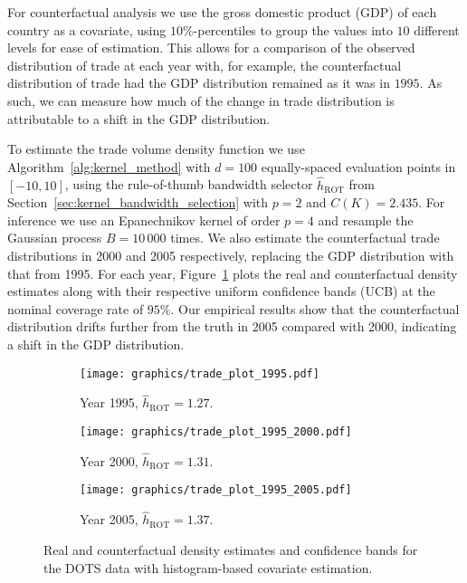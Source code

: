 \documentclass[11pt,lof]{puthesis}
\DeclareMathOperator{\ROT}{ROT}
\theoremstyle{break}
\theoremstyle{proof}
\begin{document}
For counterfactual analysis we use the gross domestic product (GDP) of each
country as a covariate, using $10\%$-percentiles to group the values into $10$
different levels for ease of estimation. This allows for a comparison of the
observed distribution of trade at each year with, for example, the
counterfactual distribution of trade had the GDP distribution remained as it
was in $1995$. As such, we can measure how much of the change in trade
distribution is attributable to a shift in the GDP distribution.

To estimate the trade volume density function we use
Algorithm~\ref{alg:kernel_method}
with $d=100$ equally-spaced evaluation points in $[-10,10]$, using the
rule-of-thumb bandwidth selector $\hat h_{\ROT}$ from
Section~\ref{sec:kernel_bandwidth_selection} with $p=2$ and $C(K) = 2.435$. For
inference we use an Epanechnikov kernel of order $p=4$ and resample the
Gaussian process $B = 10\,000$ times. We also estimate the counterfactual trade
distributions in 2000 and 2005 respectively, replacing the GDP distribution
with that from 1995. For each year, Figure~\ref{fig:kernel_trade} plots the
real and
counterfactual density estimates along with their respective uniform confidence
bands (UCB) at the nominal coverage rate of $95\%$. Our empirical results show
that the counterfactual distribution drifts further from the truth in 2005
compared with 2000, indicating a shift in the GDP distribution.

\begin{figure}[t]
\centering
%
\begin{subfigure}{0.32\textwidth}
\centering
\texttt{[image: graphics/trade\_plot\_1995.pdf]}
\caption{Year 1995, $\hat h_{\ROT} = 1.27$.}
\end{subfigure}
%
\begin{subfigure}{0.32\textwidth}
\centering
\texttt{[image: graphics/trade\_plot\_1995\_2000.pdf]}
\caption{Year 2000, $\hat h_{\ROT} = 1.31$.}
\end{subfigure}
%
\begin{subfigure}{0.32\textwidth}
\centering
\texttt{[image: graphics/trade\_plot\_1995\_2005.pdf]}
\caption{Year 2005, $\hat h_{\ROT} = 1.37$.}
\end{subfigure}
%
\caption[Histogram-based estimation and inference for the DOTS data]{
Real and counterfactual density estimates and confidence bands for
the DOTS data with histogram-based covariate estimation.}
%
\label{fig:kernel_trade}
%
\end{figure}
\end{document}
